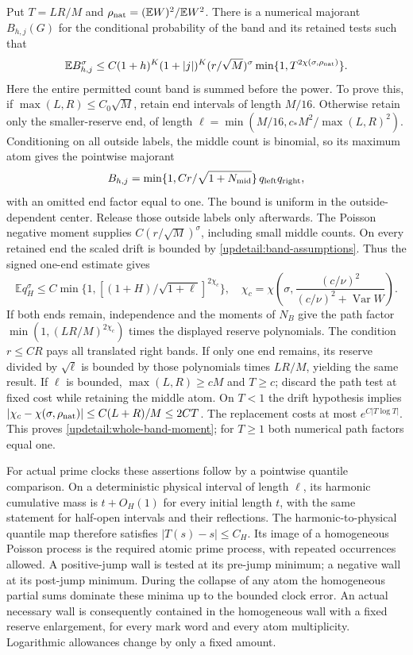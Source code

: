 Put $T=LR/M$ and
$\rho_{\rm nat}=(\mathbb EW)^2/\mathbb EW^2$.
There is a numerical majorant $B_{h,j}(G)$ for the conditional
probability of the band and its retained tests such that
\begin{equation}
 \mathbb E B_{h,j}^{\sigma}
 \leq C(1+h)^K(1+|j|)^K
       (r/\sqrt M)^\sigma
       \min\{1,T^{2\chi(\sigma,\rho_{\rm nat})}\}.
 \label{updetail:whole-band-moment}
\end{equation}
Here the entire permitted count band is summed before the power.
To prove this, if $\max(L,R)\leq C_0\sqrt M$, retain end intervals
of length $M/16$. Otherwise retain only the smaller-reserve end,
of length $\ell=\min(M/16,c_*M^2/\max(L,R)^2)$.
Conditioning on all outside labels, the middle count is binomial,
so its maximum atom gives the pointwise majorant
\[
 B_{h,j}=\min\{1,Cr/\sqrt{1+N_{\rm mid}}\}\,q_{\rm left}q_{\rm right},
\]
with an omitted end factor equal to one. The bound is uniform in the
outside-dependent center. Release those outside labels only afterwards.
The Poisson negative moment supplies $C(r/\sqrt M)^\sigma$, including
small middle counts. On every retained end the scaled drift is bounded
by \eqref{updetail:band-assumptions}. Thus the signed one-end estimate gives
\[
 \mathbb E q_H^\sigma\leq C
 \min\{1,[(1+H)/\sqrt{1+\ell}]^{2\chi_c}\},\quad
 \chi_c=\chi\left(\sigma,
 \frac{(c/\nu)^2}{(c/\nu)^2+\operatorname{Var}W}\right).
\]
If both ends remain, independence and the moments of $N_B$ give the
path factor $\min(1,(LR/M)^{2\chi_c})$ times the displayed reserve
polynomials. The condition $r\leq CR$ pays all translated right bands.
If only one end remains, its reserve divided by $\sqrt\ell$ is bounded
by those polynomials times $LR/M$, yielding the same result.
If $\ell$ is bounded, $\max(L,R)\geq cM$ and $T\geq c$; discard
the path test at fixed cost while retaining the middle atom.
On $T<1$ the drift hypothesis implies
$|\chi_c-\chi(\sigma,\rho_{\rm nat})|\leq C(L+R)/M\leq2CT$.
The replacement costs at most $e^{C|T\log T|}$. This proves
\eqref{updetail:whole-band-moment}; for $T\geq1$ both numerical path
factors equal one.

For actual prime clocks these assertions follow by a pointwise
quantile comparison. On a deterministic physical interval of length
$\ell$, its harmonic cumulative mass is $t+O_H(1)$ for every initial
length $t$, with the same statement for half-open intervals and their
reflections. The harmonic-to-physical quantile map therefore satisfies
$|T(s)-s|\leq C_H$. Its image of a homogeneous Poisson process is
the required atomic prime process, with repeated occurrences allowed.
A positive-jump wall is tested at its pre-jump minimum; a negative
wall at its post-jump minimum. During the collapse of any atom the
homogeneous partial sums dominate these minima up to the bounded
clock error. An actual necessary wall is consequently contained in
the homogeneous wall with a fixed reserve enlargement, for every mark
word and every atom multiplicity. Logarithmic allowances change by
only a fixed amount.

